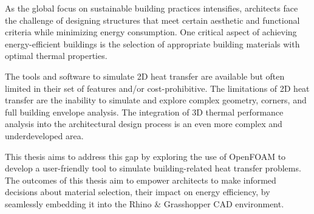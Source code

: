 
\begin{summary}

As the global focus on sustainable building practices intensifies, architects face the challenge of designing structures that meet certain aesthetic and functional criteria while minimizing energy consumption. 
One critical aspect of achieving energy-efficient buildings is the selection of appropriate building materials with optimal thermal properties. 






The tools and software to simulate 2D heat transfer are available but often limited in their set of features and/or cost-prohibitive. The limitations of 2D heat transfer are the inability to simulate and explore complex geometry, corners, and full building envelope analysis.
The integration of 3D thermal performance analysis into the architectural design process is an even more complex and underdeveloped area. 


This thesis aims to address this gap by exploring the use of OpenFOAM to develop a user-friendly tool to simulate building-related heat transfer problems.
The outcomes of this thesis aim to empower architects to make informed decisions about material selection, their impact on energy efficiency, by seamlessly embedding it into the Rhino \& Grasshopper CAD environment.

\end{summary} 